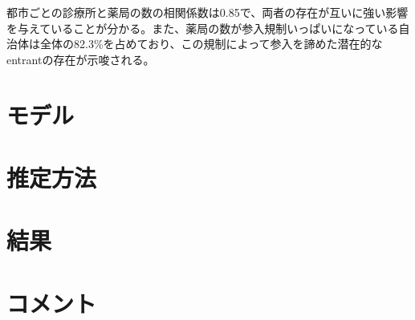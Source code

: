 \documentclass[11pt]{jsarticle}
\begin{document}
都市ごとの診療所と薬局の数の相関係数は0.85で、両者の存在が互いに強い影響を与えていることが分かる。また、薬局の数が参入規制いっぱいになっている自治体は全体の82.3\%を占めており、この規制によって参入を諦めた潜在的なentrantの存在が示唆される。

\section{モデル}

\section{推定方法}

\section{結果}

\section{コメント}
\end{document}
